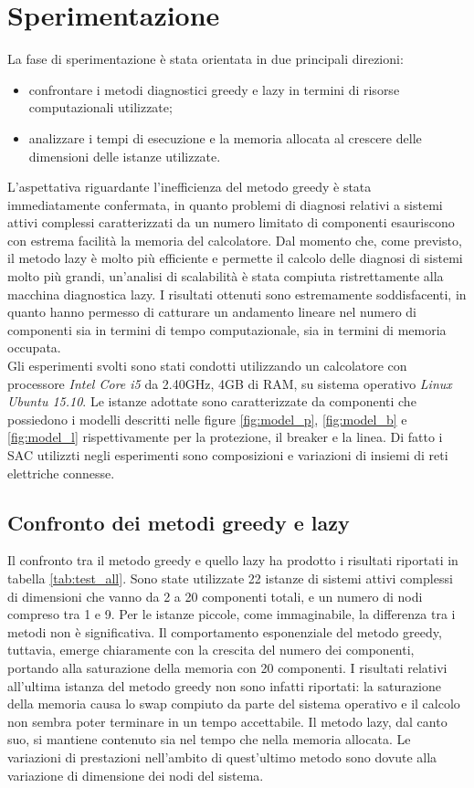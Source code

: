 \chapter{Sperimentazione}
La fase di sperimentazione è stata orientata in due principali direzioni:
\begin{itemize}
\item confrontare i metodi diagnostici greedy e lazy in termini di risorse computazionali utilizzate;
\item analizzare i tempi di esecuzione e la memoria allocata al crescere delle dimensioni delle istanze utilizzate.
\end{itemize} 
L'aspettativa riguardante l'inefficienza del metodo greedy è stata immediatamente confermata, in quanto problemi di diagnosi relativi a sistemi attivi complessi caratterizzati da un numero limitato di componenti esauriscono con estrema facilità la memoria del calcolatore. 
Dal momento che, come previsto, il metodo lazy è molto più efficiente e permette il calcolo delle diagnosi di sistemi molto più grandi, un'analisi di scalabilità è stata compiuta ristrettamente alla macchina diagnostica lazy.
I risultati ottenuti sono estremamente soddisfacenti, in quanto hanno permesso di catturare un andamento lineare nel numero di componenti sia in termini di tempo computazionale, sia in termini di memoria occupata.\\
Gli esperimenti svolti sono stati condotti utilizzando un calcolatore con processore \emph{Intel Core i5} da 2.40GHz, 4GB di RAM, su sistema operativo \emph{Linux Ubuntu 15.10}.
Le istanze adottate sono caratterizzate da componenti che possiedono i modelli descritti nelle figure \ref{fig:model_p}, \ref{fig:model_b} e \ref{fig:model_l} rispettivamente per la protezione, il breaker e la linea. Di fatto i SAC utilizzti negli esperimenti sono composizioni e variazioni di insiemi di reti elettriche connesse.

\section{Confronto dei metodi greedy e lazy}
Il confronto tra il metodo greedy e quello lazy ha prodotto i risultati riportati in tabella \ref{tab:test_all}. Sono state utilizzate 22 istanze di sistemi attivi complessi di dimensioni che vanno da 2 a 20 componenti totali, e un numero di nodi compreso tra 1 e 9. Per le istanze piccole, come immaginabile, la differenza tra i metodi non è significativa. Il comportamento esponenziale del metodo greedy, tuttavia, emerge chiaramente con la crescita del numero dei componenti, portando alla saturazione della memoria con 20 componenti. I risultati relativi all'ultima istanza del metodo greedy non sono infatti riportati: la saturazione della memoria causa lo swap compiuto da parte del sistema operativo e il calcolo non sembra poter terminare in un tempo accettabile. Il metodo lazy, dal canto suo, si mantiene contenuto sia nel tempo che nella memoria allocata. Le variazioni di prestazioni nell'ambito di quest'ultimo metodo sono dovute alla variazione di dimensione dei nodi del sistema. 

